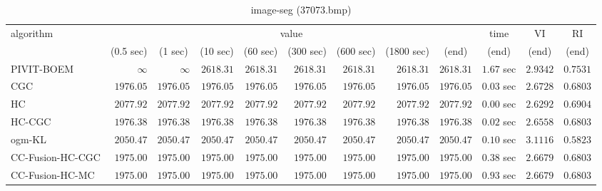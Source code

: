 \begin{table}[H]
\scriptsize
\centering
\caption{image-seg (37073.bmp)}
\label{tab:anytimetable-image-seg-37073.bmp}
\begin{tabular}{lrrrrrrrrrrr}
\toprule
           algorithm &                                   \multicolumn{8}{c}{value} & \multicolumn{1}{c}{time}    & \multicolumn{1}{c}{VI}  & \multicolumn{1}{c}{RI} \\  
\cmidrule(lr){2-9}\cmidrule(lr){10-10} \cmidrule(lr){11-11} \cmidrule(lr){12-12}   
                     & \multicolumn{1}{c}{(0.5 sec)} & \multicolumn{1}{c}{(1 sec)} & \multicolumn{1}{c}{(10 sec)} & \multicolumn{1}{c}{(60 sec)} & \multicolumn{1}{c}{(300 sec)} & \multicolumn{1}{c}{(600 sec)} & \multicolumn{1}{c}{(1800 sec)} & \multicolumn{1}{c}{(end)} & \multicolumn{1}{c}{(end)}    & \multicolumn{1}{c}{(end)}   & \multicolumn{1}{c}{(end)}  \\ \midrule 
          PIVIT-BOEM & $\infty$ & $\infty$ & $      2618.31$ & $      2618.31$ & $      2618.31$ & $      2618.31$ & $      2618.31$ & $      2618.31$ & $         1.67$ sec    & $       2.9342$  & $       0.7531$ \\ 
                 CGC & $      1976.05$ & $      1976.05$ & $      1976.05$ & $      1976.05$ & $      1976.05$ & $      1976.05$ & $      1976.05$ & $      1976.05$ & $         0.03$ sec    & $       2.6728$  & $       0.6803$ \\ 
                  HC & $      2077.92$ & $      2077.92$ & $      2077.92$ & $      2077.92$ & $      2077.92$ & $      2077.92$ & $      2077.92$ & $      2077.92$ & $         0.00$ sec    & $       2.6292$  & $       0.6904$ \\ 
              HC-CGC & $      1976.38$ & $      1976.38$ & $      1976.38$ & $      1976.38$ & $      1976.38$ & $      1976.38$ & $      1976.38$ & $      1976.38$ & $         0.02$ sec    & $       2.6558$  & $       0.6803$ \\ 
              ogm-KL & $      2050.47$ & $      2050.47$ & $      2050.47$ & $      2050.47$ & $      2050.47$ & $      2050.47$ & $      2050.47$ & $      2050.47$ & $         0.10$ sec    & $       3.1116$  & $       0.5823$ \\ 
    CC-Fusion-HC-CGC & $      1975.00$ & $      1975.00$ & $      1975.00$ & $      1975.00$ & $      1975.00$ & $      1975.00$ & $      1975.00$ & $      1975.00$ & $         0.38$ sec    & $       2.6679$  & $       0.6803$ \\ 
     CC-Fusion-HC-MC & $      1975.00$ & $      1975.00$ & $      1975.00$ & $      1975.00$ & $      1975.00$ & $      1975.00$ & $      1975.00$ & $      1975.00$ & $         0.93$ sec    & $       2.6679$  & $       0.6803$ \\ 

\end{tabular}
\end{table}
